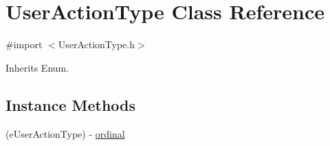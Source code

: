 \hypertarget{interface_user_action_type}{}\section{User\+Action\+Type Class Reference}
\label{interface_user_action_type}


{\ttfamily \#import $<$User\+Action\+Type.\+h$>$}



Inherits Enum.

\subsection*{Instance Methods}
\begin{DoxyCompactItemize}
\item 
(e\+User\+Action\+Type) -\/ \hyperlink{interface_user_action_type_a3657f07ff42d012f63cccbef7f3d563b}{ordinal}
\end{DoxyCompactItemize}
